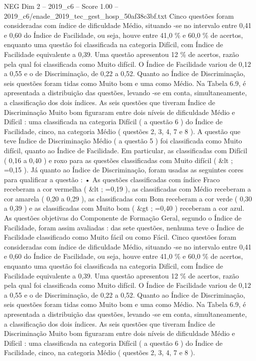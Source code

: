 \begin{textsample}{NEG Dim 2 – 2019\_c6 – Score 1.00 – 2019\_c6/enade\_2019\_tec\_gest\_hosp\_50af38c3bf.txt}
Cinco questões foram consideradas com índice de dificuldade Médio, situando -se no intervalo entre 0,41 e 0,60 do Índice de Facilidade, ou seja, houve entre 41,0 \% e 60,0 \% de acertos, enquanto uma questão foi classificada na categoria Difícil, com Índice de Facilidade equivalente a 0,39.
Uma questão apresentou 12 \% de acertos, razão pela qual foi classificada como Muito difícil.
O Índice de Facilidade variou de 0,12 a 0,55 e o de Discriminação, de 0,22 a 0,52.
Quanto ao Índice de Discriminação, seis questões foram tidas como Muito bom e uma como Médio.
Na Tabela 6.9, é apresentada a distribuição das questões, levando -se em conta, simultaneamente, a classificação dos dois índices.
As seis questões que tiveram Índice de Discriminação Muito bom figuraram entre dois níveis de dificuldade Médio e Difícil : uma classificada na categoria Difícil ( a questão 6 ) do Índice de Facilidade, cinco, na categoria Médio ( questões 2, 3, 4, 7 e 8 ).
A questão que teve Índice de Discriminação Médio ( a questão 5 ) foi classificada como Muito difícil, quanto ao Índice de Facilidade.
Em particular, as classificadas com Difícil ( 0,16 a 0,40 ) e roxo para as questões classificadas com Muito difícil ( \&lt ; =0,15 ).
Já quanto ao Índice de Discriminação, foram usadas as seguintes cores para qualificar a questão : • As questões classificadas com índice Fraco receberam a cor vermelha ( \&lt ; =0,19 ), as classificadas com Médio receberam a cor amarela ( 0,20 a 0,29 ), as classificadas com Bom receberam a cor verde ( 0,30 a 0,39 ) e as classificadas com Muito bom ( \&gt ; =0,40 ) receberam a cor azul.
As questões objetivas do Componente de Formação Geral, segundo o Índice de Facilidade, foram assim avaliadas : das sete questões, nenhuma teve o Índice de Facilidade classificado como Muito fácil ou como Fácil.
Cinco questões foram consideradas com índice de dificuldade Médio, situando -se no intervalo entre 0,41 e 0,60 do Índice de Facilidade, ou seja, houve entre 41,0 \% e 60,0 \% de acertos, enquanto uma questão foi classificada na categoria Difícil, com Índice de Facilidade equivalente a 0,39.
Uma questão apresentou 12 \% de acertos, razão pela qual foi classificada como Muito difícil.
O Índice de Facilidade variou de 0,12 a 0,55 e o de Discriminação, de 0,22 a 0,52.
Quanto ao Índice de Discriminação, seis questões foram tidas como Muito bom e uma como Médio.
Na Tabela 6.9, é apresentada a distribuição das questões, levando -se em conta, simultaneamente, a classificação dos dois índices.
As seis questões que tiveram Índice de Discriminação Muito bom figuraram entre dois níveis de dificuldade Médio e Difícil : uma classificada na categoria Difícil ( a questão 6 ) do Índice de Facilidade, cinco, na categoria Médio ( questões 2, 3, 4, 7 e 8 ).

\end{textsample}
